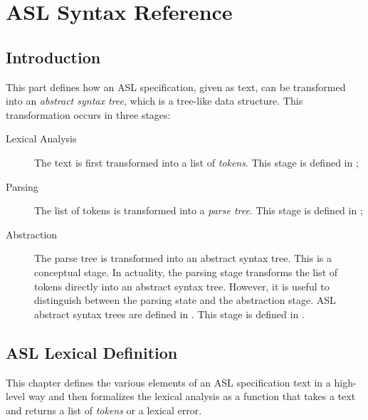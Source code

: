 %

\part{ASL Syntax Reference}

% 


% 

% 

\chapter{Introduction}
This part defines how an ASL specification, given as text, can be transformed into an \emph{abstract syntax tree},
which is a tree-like data structure. This transformation occurs in three stages:

\begin{description}
  \item[Lexical Analysis] The text is first transformed into a list of \emph{tokens}.
        This stage is defined in ;
  \item[Parsing] The list of tokens is transformed into a \emph{parse tree}.
        This stage is defined in ;
  \item[Abstraction] The parse tree is transformed into an abstract syntax tree. This is a conceptual stage. In actuality,
        the parsing stage transforms the list of tokens directly into an abstract syntax tree. However, it is useful to
        distinguish between the parsing state and the abstraction stage.
        ASL abstract syntax trees are defined in .
        This stage is defined in .
\end{description}

\chapter{ASL Lexical Definition \label{chap:lexicalanalysis}}
This chapter defines the various elements of an ASL specification text in a high-level way
and then formalizes the lexical analysis as a function that takes a text and returns
a list of \emph{tokens} or a lexical error.


